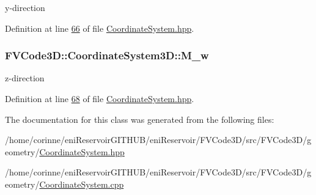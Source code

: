 y-\/direction 



Definition at line \hyperlink{CoordinateSystem_8hpp_source_l00066}{66} of file \hyperlink{CoordinateSystem_8hpp_source}{Coordinate\+System.\+hpp}.

\subsubsection[{\texorpdfstring{M\+\_\+w}{M_w}}]{ F\+V\+Code3\+D\+::\+Coordinate\+System3\+D\+::\+M\+\_\+w\hspace{0.3cm}{\ttfamily [private]}}\hypertarget{classFVCode3D_1_1CoordinateSystem3D_a2633d282f332c2129d339bec4cd53c3f}{}\label{classFVCode3D_1_1CoordinateSystem3D_a2633d282f332c2129d339bec4cd53c3f}


z-\/direction 



Definition at line \hyperlink{CoordinateSystem_8hpp_source_l00068}{68} of file \hyperlink{CoordinateSystem_8hpp_source}{Coordinate\+System.\+hpp}.



The documentation for this class was generated from the following files\+:\begin{DoxyCompactItemize}
\item 
/home/corinne/eni\+Reservoir\+G\+I\+T\+H\+U\+B/eni\+Reservoir/\+F\+V\+Code3\+D/src/\+F\+V\+Code3\+D/geometry/\hyperlink{CoordinateSystem_8hpp}{Coordinate\+System.\+hpp}\item 
/home/corinne/eni\+Reservoir\+G\+I\+T\+H\+U\+B/eni\+Reservoir/\+F\+V\+Code3\+D/src/\+F\+V\+Code3\+D/geometry/\hyperlink{CoordinateSystem_8cpp}{Coordinate\+System.\+cpp}\end{DoxyCompactItemize}
